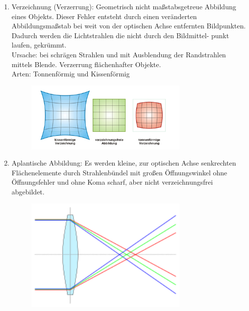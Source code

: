 \documentclass[a4paper, 11pt, ngerman, parskip=half-]{scrartcl}
\begin{document}
\begin{enumerate}
    \item Verzeichnung (Verzerrung): Geometrisch nicht maßstabsgetreue Abbildung eines Objekts. Dieser Fehler entsteht durch einen veränderten Abbildungsmaßstab bei weit von der optischen Achse entfernten Bildpunkten. Dadurch werden die Lichtstrahlen die nicht durch den Bildmittel- punkt laufen, gekrümmt.\\

          Ursache: bei schrägen Strahlen und mit Ausblendung der Randstrahlen mittels Blende. Verzerrung flächenhafter Objekte.\\
          Arten: Tonnenförmig und Kissenförmig

          \begin{figure}[H]
              \centering
              \includegraphics[width=8cm]{image/18/geo2verzeich}
          \end{figure}

    \item Aplantische Abbildung: Es werden kleine, zur optischen Achse senkrechten Flächenelemente durch Strahlenbündel mit großen Öffnungswinkel ohne Öffnungsfehler und ohne Koma scharf, aber nicht verzeichnungsfrei abgebildet.


          \begin{figure}[H]
              \centering
              \includegraphics[width=8cm]{image/18/geo2aplant}
          \end{figure}

\end{enumerate}

\newpage


\newpage
\end{document}
